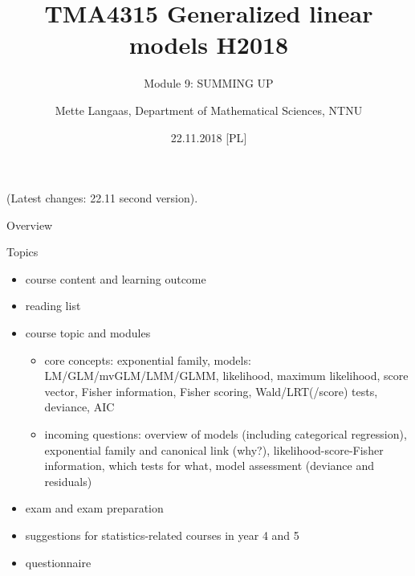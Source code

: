 \documentclass[ignorenonframetext,]{beamer}
\title{TMA4315 Generalized linear models H2018}
\subtitle{Module 9: SUMMING UP}
\author{Mette Langaas, Department of Mathematical Sciences, NTNU}
\date{22.11.2018 {[}PL{]}}
\providecommand{\tightlist}{%
  \setlength{\itemsep}{0pt}\setlength{\parskip}{0pt}}
\begin{document}
\frame{\titlepage}

\begin{frame}

(Latest changes: 22.11 second version).

\end{frame}

\begin{frame}{Overview}

\begin{block}{Topics}

\begin{itemize}
\tightlist
\item
  course content and learning outcome
\item
  reading list
\item
  course topic and modules

  \begin{itemize}
  \tightlist
  \item
    core concepts: exponential family, models: LM/GLM/mvGLM/LMM/GLMM,
    likelihood, maximum likelihood, score vector, Fisher information,
    Fisher scoring, Wald/LRT(/score) tests, deviance, AIC
  \item
    incoming questions: overview of models (including categorical
    regression), exponential family and canonical link (why?),
    likelihood-score-Fisher information, which tests for what, model
    assessment (deviance and residuals)
  \end{itemize}
\item
  exam and exam preparation
\item
  suggestions for statistics-related courses in year 4 and 5
\item
  questionnaire
\end{itemize}

\end{block}

\end{frame}
\end{document}
